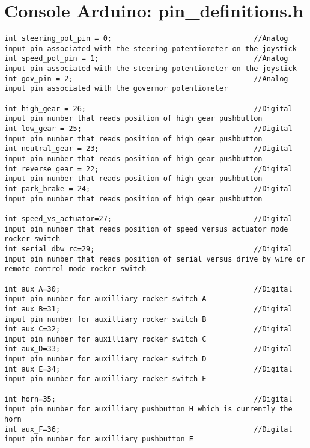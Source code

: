 \section*{Console Arduino: pin\_definitions.h}
\begin{lstlisting}[breaklines=true,basicstyle=\tiny]
int steering_pot_pin = 0;                                 //Analog input pin associated with the steering potentiometer on the joystick
int speed_pot_pin = 1;                                    //Analog input pin associated with the steering potentiometer on the joystick
int gov_pin = 2;                                          //Analog input pin associated with the governor potentiometer

int high_gear = 26;                                       //Digital input pin number that reads position of high gear pushbutton
int low_gear = 25;                                        //Digital input pin number that reads position of high gear pushbutton
int neutral_gear = 23;                                    //Digital input pin number that reads position of high gear pushbutton
int reverse_gear = 22;                                    //Digital input pin number that reads position of high gear pushbutton
int park_brake = 24;                                      //Digital input pin number that reads position of high gear pushbutton

int speed_vs_actuator=27;                                 //Digital input pin number that reads position of speed versus actuator mode rocker switch
int serial_dbw_rc=29;                                     //Digital input pin number that reads position of serial versus drive by wire or remote control mode rocker switch

int aux_A=30;                                             //Digital input pin number for auxilliary rocker switch A 
int aux_B=31;                                             //Digital input pin number for auxilliary rocker switch B
int aux_C=32;                                             //Digital input pin number for auxilliary rocker switch C
int aux_D=33;                                             //Digital input pin number for auxilliary rocker switch D 
int aux_E=34;                                             //Digital input pin number for auxilliary rocker switch E

int horn=35;                                              //Digital input pin number for auxilliary pushbutton H which is currently the horn 
int aux_F=36;                                             //Digital input pin number for auxilliary pushbutton E


\end{lstlisting}
